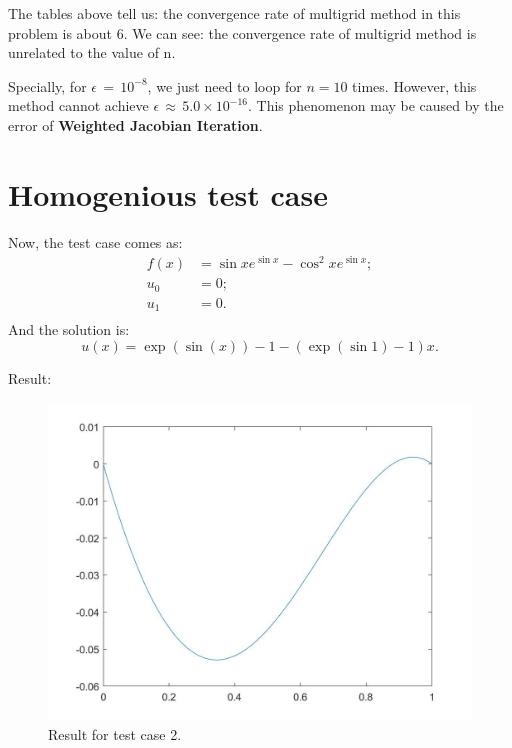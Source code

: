 \documentclass[UTF8]{ctexart}
\theoremstyle{plain}
\theoremstyle{definition}
\theoremstyle{remark}
\begin{document}
The tables above tell us: the convergence rate of multigrid method in this problem is about 6. We can see: the convergence rate of multigrid method is unrelated to the value of n.

Specially, for $\epsilon\,=\,10^{-8}$, we just need to loop for $n=10$ times. However, this method cannot achieve $\epsilon\,\approx\,5.0\times10^{-16}$. This phenomenon may be  caused by the error of \textbf{Weighted Jacobian Iteration}.
\section{Homogenious test case}
Now, the test case comes as:
$$
\begin{aligned}
f(x)&=\sin xe^{\sin x}-\cos^{2}xe^{\sin x};\\
u_{0}&=0;\\
u_{1}&=0.\\
\end{aligned}
$$
And the solution is:
$$
u(x)=\exp(\sin(x))-1-(\exp(\sin 1)-1)x.
$$

Result:
\begin{figure}[H]
\centering
\includegraphics[height=0.4\textheight,width=0.8\linewidth]{2}
\caption{Result for test case 2.}
\end{figure}
\end{document}
